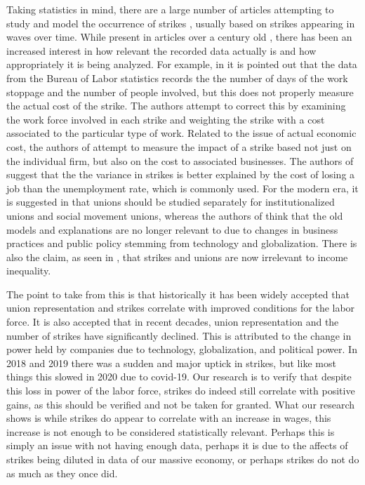 \documentclass[reqno,11pt]{amsart}
\begin{document}
Taking statistics in mind, there are a large number of articles attempting
to study and model the occurrence of strikes \cite{Kennan, Kennan2, Mauro, Naples}, 
usually based on strikes appearing in waves over time. While present 
in articles over a century old \cite{Cross},
there has been an increased interest in
how relevant the recorded data actually is and how appropriately it is being
analyzed. For example,
in \cite{PalombaPalomba} it is pointed out that the data
from the Bureau of Labor statistics records the
the number of days of the work stoppage and the number of people involved,
but this does not properly measure the actual cost of the strike. The authors
attempt to correct this by examining the work force involved in each strike
and weighting the strike with a cost associated to the particular type of work.
Related to the issue of actual economic cost, the authors of \cite{Mchugh}
attempt to measure the impact of a strike based not just on the individual firm, 
but also on the cost to associated businesses.
The authors of \cite{SchorBowles} suggest that the the variance in strikes is better explained 
by the cost of losing a job than the unemployment rate, which is commonly used.
For the modern era, it is suggested in \cite{MartinDixon} that unions should be
studied separately for institutionalized unions and social movement unions,
whereas the authors of \cite{KeeranTarpinian} think that the old models
and explanations are no longer relevant to due to changes in business practices and public policy
stemming from technology and globalization. There is also the claim,
as seen in \cite{WallaceLeichtRaffalovich}, that strikes and unions are now irrelevant
to income inequality.


The point to take from this is that historically it has been widely accepted that
union representation and strikes correlate with improved conditions for the labor force. It is
also accepted that in recent decades, union representation and the number of strikes 
have significantly declined. This is attributed to the change in power held
by companies due to technology, globalization, and political power. In 2018 and 
2019 there was a sudden and major uptick in strikes, but like most things this
slowed in 2020 due to covid-19. Our research
is to verify that despite this loss in power of the labor force, strikes do indeed
still correlate with positive gains, as this should be verified and not be taken for granted.
What our research shows is while strikes do appear to correlate with an increase in wages,
this increase is not enough to be considered statistically relevant. 
Perhaps this is simply an issue with not having enough data, perhaps it is
due to the affects of strikes being diluted in data of our massive economy,
or perhaps strikes do not do as much as they once did.
\end{document}

